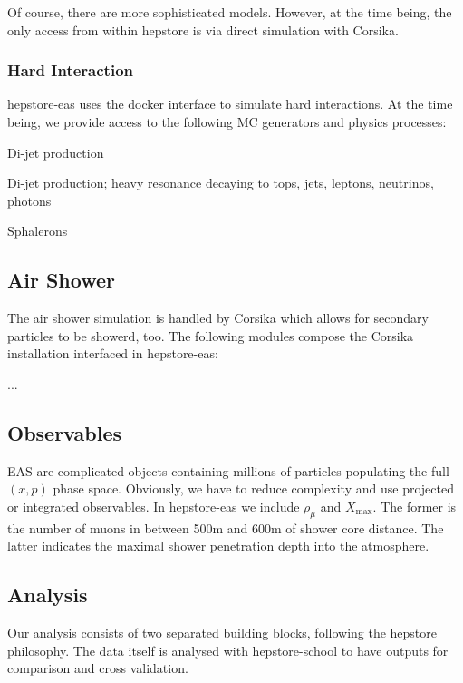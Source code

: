 Of course, there are more sophisticated models. However, at the time
being, the only access from within hepstore is via direct simulation
with Corsika.

\subsubsection{Hard Interaction}
hepstore-eas uses the docker interface to simulate hard
interactions. At the time being, we provide access to the following MC
generators and physics processes:
%
\begin{description}
\item[Corsika] Di-jet production
\item[Herwig 7] Di-jet production; heavy resonance decaying to tops,
  jets, leptons, neutrinos, photons
\item[Herwig++] Sphalerons   
\end{description}
%

\subsection{Air Shower}
The air shower simulation is handled by Corsika which allows for
secondary particles to be showerd, too. The following modules compose
the Corsika installation interfaced in hepstore-eas:
%
\begin{description}
\item[Hadronic Interactions] ...
\end{description}
%

\subsection{Observables}
EAS are complicated objects containing millions of particles
populating the full $(x,p)$ phase space. Obviously, we have to reduce
complexity and use projected or integrated observables. In
hepstore-eas we include $\rho_\mu$ and $X_\text{max}$. The former is
the number of muons in between 500m and 600m of shower core
distance. The latter indicates the maximal shower penetration depth
into the atmosphere.


\subsection{Analysis}
Our analysis consists of two separated building blocks, following the
hepstore philosophy. The data itself is analysed with hepstore-school
to have outputs for comparison and cross validation.

